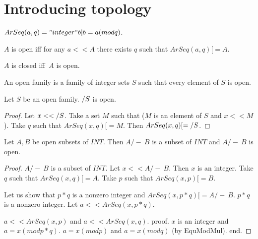 \documentclass{document}
\begin{document}
  \section{Introducing topology}

  \begin{forthel}

    \begin{definition}[ArSeq]
      $ArSeq(a,q) = { "integer" b | b = a (mod q) }$.
    \end{definition}

    \begin{definition}[Open]
      $A$ is open iff for any $a << A$ there exists $q$ such that $ArSeq(a,q) [= A$.
    \end{definition}

    \begin{definition}[Closed]
      $A$ is closed iff $~A$ is open.
    \end{definition}

    \begin{definition}[OpenIntegerSets]
      An open family is a family of integer sets $S$ such that every element of $S$ is open.
    \end{definition}

    \begin{lemma}[UnionOpen]
      Let $S$ be an open family. $\-/ S$ is open.
    \end{lemma}
    \begin{proof}
      Let $x << \-/ S$. Take a set $M$ such that ($M$ is an element of $S$ and $x << M$). Take $q$ such that $ArSeq(x,q) [= M$. Then $ArSeq(x,q) [= \-/ S$.
    \end{proof}

    \begin{lemma}[InterOpen]
      Let $A,B$ be open subsets of $INT$. Then $A /-\ B$ is a subset of $INT$ and $A /-\ B$ is open.
    \end{lemma}
    \begin{proof}
      $A /-\ B$ is a subset of $INT$. Let $x << A /-\ B$. Then $x$ is an integer. Take $q$ such that $ArSeq(x,q) [= A$. Take $p$ such that $ArSeq(x,p) [= B$.

      Let us show that $p*q$ is a nonzero integer and $ArSeq(x, p * q) [= A /-\ B$.
        $p*q$ is a nonzero integer. Let $a << ArSeq(x, p * q)$.

        $a << ArSeq (x, p)$ and $a << ArSeq (x, q)$.
        proof.
          $x$ is an integer and $a = x (mod p * q)$. $a = x (mod p)$ and $a = x (mod q)$ (by EquModMul).
        end.


\end{proof}
\end{forthel}
\end{document}
